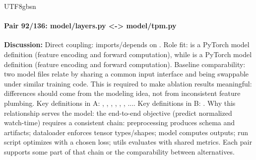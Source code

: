 \documentclass[11pt]{article}
\begin{document}
\begin{CJK*}{UTF8}{gbsn}
\paragraph{Pair 92/136: model/layers.py <-> model/tpm.py}
\textbf{Discussion:} Direct coupling: \texttt{} imports/depends on \texttt{}. Role fit: \texttt{} is a PyTorch model definition (feature encoding and forward computation), while \texttt{} is a PyTorch model definition (feature encoding and forward computation). Baseline comparability: two model files relate by sharing a common input interface and being swappable under similar training code. This is required to make ablation results meaningful: differences should come from the modeling idea, not from inconsistent feature plumbing. Key definitions in A: \texttt{}, \texttt{}, \texttt{}, \texttt{}, \texttt{}, \texttt{}, .... Key definitions in B: \texttt{}. Why this relationship serves the model: the end-to-end objective (predict normalized watch-time) requires a consistent chain: preprocessing produces schema and artifacts; dataloader enforces tensor types/shapes; model computes outputs; run script optimizes with a chosen loss; utils evaluates with shared metrics. Each pair supports some part of that chain or the comparability between alternatives.


\end{CJK*}
\end{document}

